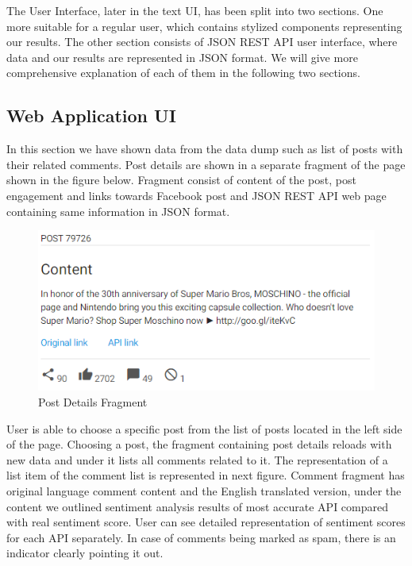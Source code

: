 The User Interface, later in the text UI, has been split into two sections. One more suitable for a regular user, which contains stylized components representing our results. The other section consists of JSON REST API user interface, where data and our results are represented in JSON format. We will give more comprehensive explanation of each of them in the following two sections.

\subsection{Web Application UI}\label{sec:web-app}

In this section we have shown data from the data dump such as list of posts with their related comments. Post details are shown in a separate fragment of the page shown in the figure below. Fragment consist of content of the post, post engagement and links towards Facebook post and JSON REST API web page containing same information in JSON format.

\begin{figure}[ht]
	\centering	
	\includegraphics[width=1\textwidth]{04-framework/03-user-interface/images/post_details.png}
	\caption[Post Details Fragment]{Post Details Fragment \label{fig:post-details}}
\end{figure}
 
User is able to choose a specific post from the list of posts located in the left side of the page. Choosing a post, the fragment containing post details reloads with new data and under it lists all comments related to it. The representation of a list item of the comment list is represented in next figure. Comment fragment has original language comment content and the English translated version, under the content we outlined sentiment analysis results of most accurate API compared with real sentiment score. User can see detailed representation of sentiment scores for each API separately. In case of comments being marked as spam, there is an indicator clearly pointing it out.

